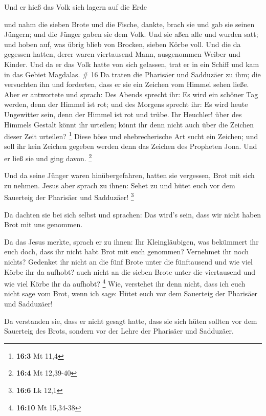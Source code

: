  Und er hieß das Volk sich lagern auf die Erde

 und nahm die sieben Brote und die Fische, dankte, brach
sie und gab sie seinen Jüngern; und die Jünger gaben sie dem Volk.
 Und sie aßen alle und wurden satt; und hoben auf, was
übrig blieb von Brocken, sieben Körbe voll.  Und die da
gegessen hatten, derer waren viertausend Mann, ausgenommen Weiber und
Kinder.  Und da er das Volk hatte von sich gelassen, trat
er in ein Schiff und kam in das Gebiet Magdalas. \# 16  Da
traten die Pharisäer und Sadduzäer zu ihm; die versuchten ihn und
forderten, dass er sie ein Zeichen vom Himmel sehen ließe.
 Aber er antwortete und sprach: Des Abends sprecht ihr: Es
wird ein schöner Tag werden, denn der Himmel ist rot;  und
des Morgens sprecht ihr: Es wird heute Ungewitter sein, denn der Himmel
ist rot und trübe. Ihr Heuchler! über des Himmels Gestalt könnt ihr
urteilen; könnt ihr denn nicht auch über die Zeichen dieser Zeit
urteilen? \footnote{\textbf{16:3} Mt 11,4}  Diese böse und
ehebrecherische Art sucht ein Zeichen; und soll ihr kein Zeichen gegeben
werden denn das Zeichen des Propheten Jona. Und er ließ sie und ging
davon. \footnote{\textbf{16:4} Mt 12,39-40}

 Und da seine Jünger waren hinübergefahren, hatten sie
vergessen, Brot mit sich zu nehmen.  Jesus aber sprach zu
ihnen: Sehet zu und hütet euch vor dem Sauerteig der Pharisäer und
Sadduzäer! \footnote{\textbf{16:6} Lk 12,1}

 Da dachten sie bei sich selbst und sprachen: Das wird's
sein, dass wir nicht haben Brot mit uns genommen.

 Da das Jesus merkte, sprach er zu ihnen: Ihr
Kleingläubigen, was bekümmert ihr euch doch, dass ihr nicht habt Brot
mit euch genommen?  Vernehmet ihr noch nichts? Gedenket
ihr nicht an die fünf Brote unter die fünftausend und wie viel Körbe ihr
da aufhobt?  auch nicht an die sieben Brote unter die
viertausend und wie viel Körbe ihr da aufhobt? \footnote{\textbf{16:10}
  Mt 15,34-38}  Wie, verstehet ihr denn nicht, dass ich
euch nicht sage vom Brot, wenn ich sage: Hütet euch vor dem Sauerteig
der Pharisäer und Sadduzäer!

 Da verstanden sie, dass er nicht gesagt hatte, dass sie
sich hüten sollten vor dem Sauerteig des Brots, sondern vor der Lehre
der Pharisäer und Sadduzäer.

